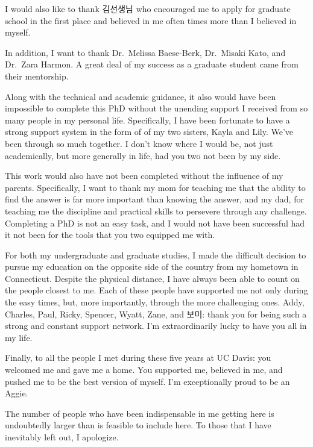 \documentclass[
  12pt,
  letterpaper,
]{scrreport}
\begin{document}
I would also like to thank 김선생님 who encouraged me to apply for
graduate school in the first place and believed in me often times more
than I believed in myself.

In addition, I want to thank Dr.~Melissa Baese-Berk, Dr.~Misaki Kato,
and Dr.~Zara Harmon. A great deal of my success as a graduate student
came from their mentorship.

Along with the technical and academic guidance, it also would have been
impossible to complete this PhD without the unending support I received
from so many people in my personal life. Specifically, I have been
fortunate to have a strong support system in the form of of my two
sisters, Kayla and Lily. We've been through so much together. I don't
know where I would be, not just academically, but more generally in
life, had you two not been by my side.

This work would also have not been completed without the influence of my
parents. Specifically, I want to thank my mom for teaching me that the
ability to find the answer is far more important than knowing the
answer, and my dad, for teaching me the discipline and practical skills
to persevere through any challenge. Completing a PhD is not an easy
task, and I would not have been successful had it not been for the tools
that you two equipped me with.

For both my undergraduate and graduate studies, I made the difficult
decision to pursue my education on the opposite side of the country from
my hometown in Connecticut. Despite the physical distance, I have always
been able to count on the people closest to me. Each of these people
have supported me not only during the easy times, but, more importantly,
through the more challenging ones. Addy, Charles, Paul, Ricky, Spencer,
Wyatt, Zane, and 보미: thank you for being such a strong and constant
support network. I'm extraordinarily lucky to have you all in my life.

Finally, to all the people I met during these five years at UC Davis:
you welcomed me and gave me a home. You supported me, believed in me,
and pushed me to be the best version of myself. I'm exceptionally proud
to be an Aggie.

The number of people who have been indispensable in me getting here is
undoubtedly larger than is feasible to include here. To those that I
have inevitably left out, I apologize.

\doublespacing

\setlength{\parindent}{4em}
\end{document}
